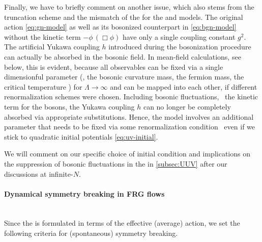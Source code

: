 Finally, we have to briefly comment on another issue, which also stems from the truncation scheme and the mismatch of the \ics{} for the \bgn{} and \gny{} models. The original \gn{} action \eqref{eq:gn-model} as well as its bosonized counterpart in \cref{eq:bgn-model} without the kinetic term $-\phi \, ( \Box \phi )$ have only a single coupling constant $g^2$. The artificial Yukawa coupling $h$ introduced during the bosonization procedure can actually be absorbed in the bosonic field. In mean-field calculations, see below, this is evident, because all observables can be fixed via a single dimensionful parameter (\eg{}, the \ir{} bosonic curvature mass, the \ir{} fermion mass, the critical temperature \etc{}) for $\Lambda \rightarrow \infty$ and can be mapped into each other, if different renormalization schemes were chosen. Including bosonic fluctuations, \ie{}\ the kinetic term for the bosons, the Yukawa coupling $h$ can no longer be completely absorbed via appropriate substitutions. Hence, the model involves an additional parameter that needs to be fixed via some renormalization condition~\cite{ZinnJustin:2002ru} \dash{} even if we stick to quadratic initial potentials \eqref{eq:uv-initial}.

We will comment on our specific choice of initial condition and implications on the suppression of bosonic fluctuations in the \uv{} in \cref{subsec:UUV} after our discussions at infinite-$N$.

\paragraph{Dynamical symmetry breaking in FRG flows}\label{paragraph:GNdSB}\mbox{}\\%
Since the \frg{} is formulated in terms of the effective (average) action, we set the following criteria for (spontaneous) symmetry breaking.
	
